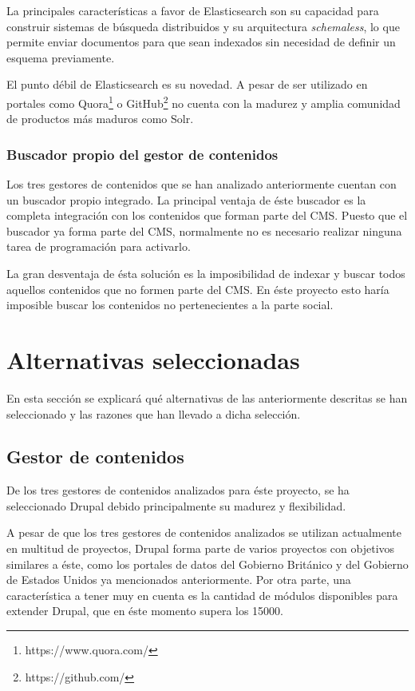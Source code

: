 La principales características a favor de Elasticsearch son su capacidad para construir sistemas de búsqueda distribuidos y su arquitectura \textit{schemaless}, lo que permite enviar documentos para que sean indexados sin necesidad de definir un esquema previamente.

El punto débil de Elasticsearch es su novedad. A pesar de ser utilizado en portales como Quora\footnote{https://www.quora.com/} o GitHub\footnote{https://github.com/} no cuenta con la madurez y amplia comunidad de productos más maduros como Solr.


\subsubsection{Buscador propio del gestor de contenidos}
Los tres gestores de contenidos que se han analizado anteriormente cuentan con un buscador propio integrado.  La principal ventaja de éste buscador es la completa integración con los contenidos que forman parte del CMS.  Puesto que el buscador ya forma parte del CMS, normalmente no es necesario realizar ninguna tarea de programación para activarlo.

La gran desventaja de ésta solución es la imposibilidad de indexar y buscar todos aquellos contenidos que no formen parte del CMS.  En éste proyecto esto haría imposible buscar los contenidos no pertenecientes a la parte social.



\section{Alternativas seleccionadas}
\label{chapter02:alternativas_seleccionadas}
\label{seccion_alternativas}
En esta sección se explicará qué alternativas de las anteriormente descritas se han seleccionado y las razones que han llevado a dicha selección.

\subsection{Gestor de contenidos}
De los tres gestores de contenidos analizados para éste proyecto, se ha seleccionado Drupal debido principalmente su madurez y flexibilidad.

A pesar de que los tres gestores de contenidos analizados se utilizan actualmente en multitud de proyectos, Drupal forma parte de varios proyectos con objetivos similares a éste, como los portales de datos del Gobierno Británico y del Gobierno de Estados Unidos ya mencionados anteriormente. Por otra parte, una característica a tener muy en cuenta es la cantidad de módulos disponibles para extender Drupal, que en éste momento supera los 15000.

